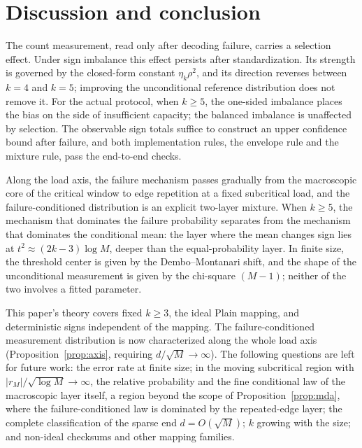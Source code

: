 \section{Discussion and conclusion}
The count measurement, read only after decoding failure, carries a selection effect. Under sign imbalance this effect persists after standardization.
Its strength is governed by the closed-form constant $\eta_k\rho^2$, and its direction reverses between $k=4$ and $k=5$; improving the unconditional
reference distribution does not remove it. For the actual protocol, when $k\ge5$, the one-sided imbalance places the bias on the side of insufficient capacity;
the balanced imbalance is unaffected by selection. The observable sign totals suffice to construct an upper confidence bound after failure,
and both implementation rules, the envelope rule and the mixture rule, pass the end-to-end checks.

Along the load axis, the failure mechanism passes gradually from the macroscopic core of the critical window to edge repetition at a fixed subcritical load, and the failure-conditioned distribution is an explicit two-layer mixture.
When $k\ge5$, the mechanism that dominates the failure probability separates from the mechanism that dominates the conditional mean: the layer where the mean changes sign lies at
$t^2\approx(2k-3)\log M$, deeper than the equal-probability layer. In finite size, the threshold center is given by
the Dembo--Montanari shift, and the shape of the unconditional measurement is given by the chi-square
$(M-1)$; neither of the two involves a fitted parameter.

This paper's theory covers fixed $k\ge3$, the ideal Plain mapping, and deterministic signs independent of the mapping. The failure-conditioned measurement
distribution is now characterized along the whole load axis (Proposition~\ref{prop:axis}, requiring $d/\sqrt M\to\infty$). The following questions are left for future work:
the error rate at finite size; in the moving subcritical region with $|r_M|/\sqrt{\log M}\to\infty$,
the relative probability and the fine conditional law of the macroscopic layer itself, a region beyond the scope of Proposition~\ref{prop:mda}, where the failure-conditioned law
is dominated by the repeated-edge layer; the complete classification of the sparse end $d=O(\sqrt M)$; $k$ growing with the size; and non-ideal checksums and other mapping families.
